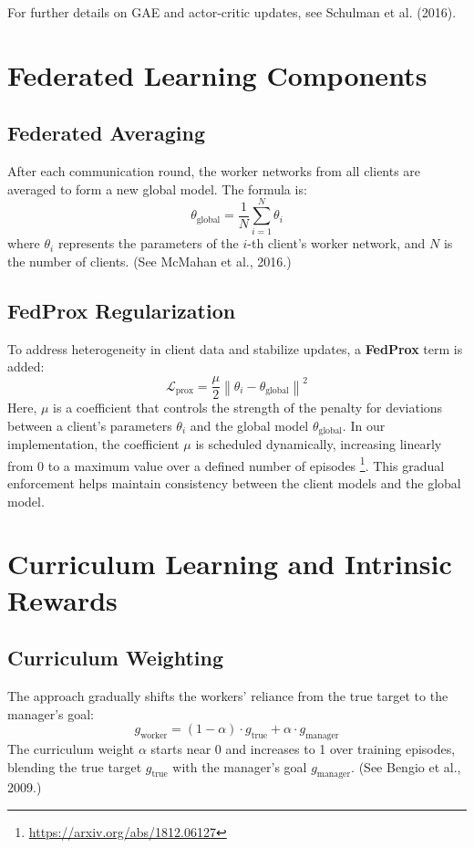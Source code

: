 \documentclass{article}
\begin{document}
For further details on GAE and actor-critic updates, see Schulman et al. (2016).

\section{Federated Learning Components}

\subsection{Federated Averaging}
After each communication round, the worker networks from all clients are averaged to form a new global model. The formula is:
\[
\theta_{\text{global}} = \frac{1}{N} \sum_{i=1}^{N} \theta_i
\]
where \( \theta_i \) represents the parameters of the \( i \)-th client’s worker network, and \( N \) is the number of clients. (See McMahan et al., 2016.)

\subsection{FedProx Regularization}
To address heterogeneity in client data and stabilize updates, a \textbf{FedProx} term is added:
\[
\mathcal{L}_{\text{prox}} = \frac{\mu}{2} \left\| \theta_i - \theta_{\text{global}} \right\|^2
\]
Here, \( \mu \) is a coefficient that controls the strength of the penalty for deviations between a client’s parameters \( \theta_i \) and the global model \( \theta_{\text{global}} \).
In our implementation, the coefficient \(\mu\) is scheduled dynamically, increasing linearly from 0 to a maximum value over a defined number of episodes \cite{Li2020}\footnote{\url{https://arxiv.org/abs/1812.06127}}. This gradual enforcement helps maintain consistency between the client models and the global model.

\section{Curriculum Learning and Intrinsic Rewards}

\subsection{Curriculum Weighting}
The approach gradually shifts the workers’ reliance from the true target to the manager’s goal:
\[
g_{\text{worker}} = (1 - \alpha) \cdot g_{\text{true}} + \alpha \cdot g_{\text{manager}}
\]
The curriculum weight \( \alpha \) starts near 0 and increases to 1 over training episodes, blending the true target \( g_{\text{true}} \) with the manager’s goal \( g_{\text{manager}} \). (See Bengio et al., 2009.)
\end{document}
